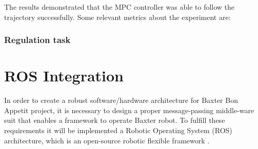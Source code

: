 \documentclass[11pt]{report} %
\begin{document}
The results demonstrated that the MPC controller was able to follow the trajectory successfully. Some relevant metrics about the experiment are:

\begin{table}[H]
\begin{center}
\caption{\label{tab:performance_metrics_tracking} Performance metrics for mouth tracking experiment.}
\end{center}
\end{table}

\subsection{Regulation task}































\chapter{ROS Integration}

In order to create a robust software/hardware architecture for Baxter Bon Appetit project, it is necessary to design a proper message-passing middle-ware suit that enables a framework to operate Baxter robot. To fulfill these requirements it will be implemented a Robotic Operating System (ROS) architecture, which is an open-source robotic flexible framework \citep{cite_about_ros}.\\
\end{document}
